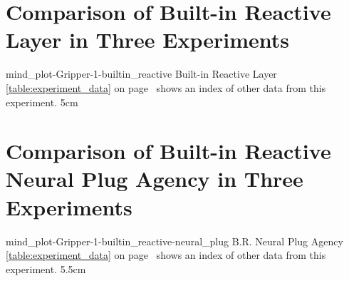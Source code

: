 {\clearpage
  \section{Comparison of Built-in Reactive Layer in Three Experiments}
  \experimentcausegroupplots{\dataappendixmaxtime}
                            {\dataappendixexperimentonemaxtime}
                            {\dataappendixexperimenttwomaxtime}
                            {\dataappendixexperimentthreemaxtime}
                            {\dataappendixexperimentonename}
                            {\dataappendixexperimenttwoname}
                            {\dataappendixexperimentthreename}
                            {\dataappendixexperimentoneprettyname}
                            {\dataappendixexperimenttwoprettyname}
                            \experimentcausegroupplotscontinued{\dataappendixexperimentthreeprettyname}
                                                               {mind_plot-Gripper-1-builtin_reactive}
                                                               {Built-in Reactive Layer}
                                                               {  {\mbox{\autoref{table:experiment_data}}} on
                                                                 {\mbox{page~\pageref{table:experiment_data}}} shows an index of other data
                                                                 from this experiment.}
                                                               {5cm}
}
{\clearpage
  \section{Comparison of Built-in Reactive Neural Plug Agency in Three Experiments}
  \experimentcausegroupplots{\dataappendixmaxtime}
                            {\dataappendixexperimentonemaxtime}
                            {\dataappendixexperimenttwomaxtime}
                            {\dataappendixexperimentthreemaxtime}
                            {\dataappendixexperimentonename}
                            {\dataappendixexperimenttwoname}
                            {\dataappendixexperimentthreename}
                            {\dataappendixexperimentoneprettyname}
                            {\dataappendixexperimenttwoprettyname}
                            \experimentcausegroupplotscontinued{\dataappendixexperimentthreeprettyname}
                                                               {mind_plot-Gripper-1-builtin_reactive-neural_plug}
                                                               {B.R. Neural Plug Agency}
                                                               {  {\mbox{\autoref{table:experiment_data}}} on
                                                                 {\mbox{page~\pageref{table:experiment_data}}} shows an index of other data
                                                                 from this experiment.}
                                                               {5.5cm}
}
